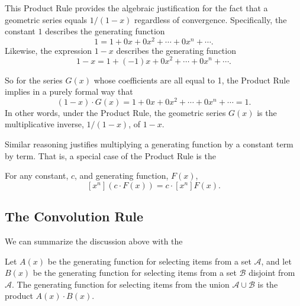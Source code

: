 This Product Rule provides the algebraic justification for the fact
that a geometric series equals $1/(1-x)$ regardless of convergence.
Specifically, the constant $1$ describes the generating function
\[
1 = 1+ 0x+ 0x^2 + \cdots + 0x^n + \cdots.
\]
Likewise, the expression $1-x$ describes the generating function
\[
1-x = 1+ (-1)x+ 0x^2 + \cdots + 0x^n + \cdots.
\]
\iffalse Since all but the first two coefficents for $1-x$ are zero,
the Product Rule implies that for any generating function $F(x)$,
\begin{align*}
[x^0]((1-x)F(x)) & = f_0\\
[x^n]((1-x)F(x)) & = f_n-f_{n-1}m & for $n>0$,
\end{align*}
so in particular for geometric series $G(x)$, the only nonzero coefficent
of $(1-x)\cdot G(x)$ is the coefficient of $x^0$, which equals $g_0 = 1$.
\fi
So for the series $G(x)$ whose coefficients are all equal to 1, the
Product Rule implies in a purely formal way that
\[
(1-x)\cdot G(x) = 1+ 0x+ 0x^2 + \cdots + 0x^n + \cdots = 1.
\]
In other words, under the Product Rule, the geometric series $G(x)$ is
the multiplicative inverse, $1/(1-x)$, of $1-x$.

Similar reasoning justifies multiplying a generating function by a
constant term by term.  That is, a special case of the Product Rule is
the
\begin{rul*}
For any constant, $c$, and generating function, $F(x)$,
\begin{equation}\label{xncFcn}
[x^n](c \cdot F(x)) = c \cdot [x^n]F(x).
\end{equation}
\end{rul*}

\iffalse
Letting
\[
P(x) = (1-x) \cdot (1+x+x^2+\cdots+x^n+\cdots),
\]
the Product Rule gives
\begin{align*}
[x^0]P(x) & = 1 \cdot 1 = 1,\\
[x^{n+1}]P(x)& = 1\cdot 1+ (-1)\cdot 1 +0\cdot 1 +\cdots + 0\cdot 1 = 0.
\end{align*}
That is,
\[
P(x) = 1 + 0\cdot x +  0\cdot x^2 + \cdots = 1.
\]
\fi

\subsection{The Convolution Rule}

We can summarize the discussion above with the
\begin{mathrule*}\label{convolution_rule}
Let $A(x)$ be the generating function for selecting items from a set
$\mathcal{A}$, and let $B(x)$ be the generating function for selecting
items from a set $\mathcal{B}$ disjoint from $\mathcal{A}$.  The
generating function for selecting items from the union $\mathcal{A} \cup
\mathcal{B}$ is the product $A(x) \cdot B(x)$.
\end{mathrule*}

